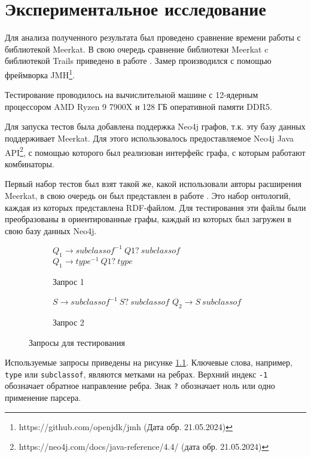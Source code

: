 \chapter{Экспериментальное исследование}
\label{ch:ch4}


Для анализа полученного результата был проведено сравнение времени работы с библиотекой Meerkat. В свою очередь сравнение библиотеки Meerkat c библиотекой Trails приведено в работе \cite{MeerkatGraphs}. Замер производился с помощью фреймворка JMH\footnote{https://github.com/openjdk/jmh (Дата обр. 21.05.2024)}.

Тестирование проводилось на вычислительной машине с 12-ядерным процессором AMD Ryzen 9 7900X и 128 ГБ оперативной памяти DDR5.

Для запуска тестов была добавлена поддержка Neo4j графов, т.к. эту базу данных поддерживает Meerkat. Для этого использовалось предоставляемое Neo4j Java API\footnote{https://neo4j.com/docs/java-reference/4.4/ (дата обр. 21.05.2024)}, с помощью которого был реализован интерфейс графа, с которым работают комбинаторы.

Первый набор тестов был взят такой же, какой использовали авторы расширения Meerkat, в свою очередь он был представлен в работе \cite{RDF_CF}. Это набор онтологий, каждая из которых представлена RDF-файлом. Для тестирования эти файлы были преобразованы в ориентированные графы, каждый из которых был загружен в свою базу данных Neo4j.

\begin{figure}[htp]
    \centering
    \begin{subfigure}[b]{0.49\textwidth}
        \centering
        $Q_1 \to subclassof^{-1}\ Q1?\ subclassof$\\
        $Q_1 \to type^{-1}\ Q1?\ type$\\
        \caption{Запрос 1}
    \end{subfigure}
    \hfill
    \begin{subfigure}[b]{0.49\textwidth}
        \centering
        $S \to subclassof^{-1}\ S?\ subclassof$
        $Q_2 \to S\ subclassof$
        \caption{Запрос 2}
    \end{subfigure}
    \caption{Запросы для тестирования}
    \label{fig:queries}
\end{figure}

Используемые запросы приведены на рисунке \ref{fig:queries}. Ключевые слова, например, \texttt{type} или \texttt{subclassof}, являются метками на ребрах. Верхний индекс \texttt{-1} обозначает обратное направление ребра. Знак \texttt{?} обозначает ноль или одно применение парсера.

